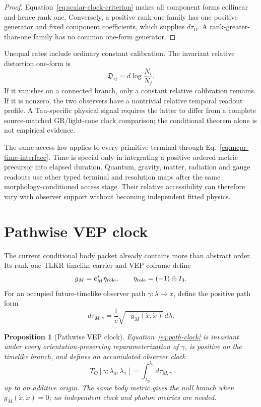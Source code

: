 \documentclass[11pt]{article}
\newtheorem{proposition}{Proposition}
\begin{document}
\begin{proof}
Equation~\eqref{eq:scalar-clock-criterion} makes all component forms
collinear and hence rank one. Conversely, a positive rank-one family has one
positive generator and fixed component coefficients, which supplies
$d\tau_O$. A rank-greater-than-one family has no common one-form generator.
\end{proof}

Unequal rates include ordinary constant calibration. The invariant relative
distortion one-form is
\begin{equation}
 \mathfrak D_{ij}=d\log\frac{N_i}{N_j}.
 \label{eq:relative-distortion}
\end{equation}
If it vanishes on a connected branch, only a constant relative calibration
remains. If it is nonzero, the two observers have a nontrivial relative
temporal readout profile. A Tau-specific physical signal requires the latter
to differ from a complete source-matched GR/light-cone clock comparison; the
conditional theorem alone is not empirical evidence.

The same access law applies to every primitive terminal through
Eq.~\eqref{eq:mcpr-time-interface}. Time is special only in integrating a
positive ordered metric precursor into elapsed duration. Quantum, gravity,
matter, radiation and gauge readouts use other typed terminal and resolution
maps after the same morphology-conditioned access stage. Their relative
accessibility can therefore vary with observer support without becoming
independent fitted physics.

\section{Pathwise VEP clock}

The current conditional body packet already contains more than abstract
order. Its rank-one TLKR timelike carrier and VEP coframe define
\begin{equation}
 g_M=e_M^*\eta_{\rm role},
 \qquad \eta_{\rm role}=(-1)\oplus I_3.
 \label{eq:vep-metric}
\end{equation}
For an occupied future-timelike observer path \(\gamma:\lambda\mapsto x\),
define the positive path form
\begin{equation}
 d\tau_{M,\gamma}
 =\frac{1}{c}\sqrt{-g_M(\dot x,\dot x)}\,d\lambda.
 \label{eq:path-clock}
\end{equation}

\begin{proposition}[Pathwise VEP clock]
Equation~\eqref{eq:path-clock} is invariant under every
orientation-preserving reparameterization of \(\gamma\), is positive on the
timelike branch, and defines an accumulated observer clock
\begin{equation}
 T_O[\gamma;\lambda_0,\lambda_1]
 =\int_{\lambda_0}^{\lambda_1}d\tau_{M,\gamma}
 \label{eq:path-functional}
\end{equation}
up to an additive origin. The same body metric gives the null branch when
\(g_M(\dot x,\dot x)=0\); no independent clock and photon metrics are needed.
\end{proposition}
\end{document}
